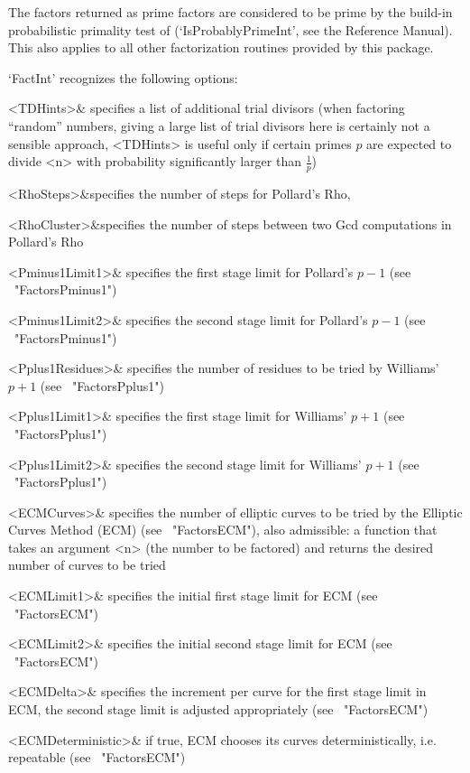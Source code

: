 The factors returned as prime factors are considered to be prime 
by the build-in probabilistic primality test of {\GAP} 
(`IsProbablyPrimeInt', see the Reference Manual).
This also applies to all other factorization routines 
provided by this package.

`FactInt' recognizes the following options:

\beginitems
   <TDHints>& specifies a list of additional trial divisors
   (when factoring ``random'' numbers, giving a large list
   of trial divisors here is certainly not a sensible approach,
   <TDHints> is useful only if certain primes $p$ are expected to
   divide <n> with probability significantly larger than 
   $\frac{1}{p}$)

   <RhoSteps>&specifies the number of steps for Pollard's Rho,

   <RhoCluster>&specifies the number of steps between two
   Gcd computations in Pollard's Rho

   <Pminus1Limit1>& specifies the first stage limit for Pollard's $p-1$
   (see ~"FactorsPminus1")

   <Pminus1Limit2>& specifies the second stage limit for Pollard's $p-1$
   (see ~"FactorsPminus1")

   <Pplus1Residues>& specifies the number of residues
   to be tried by Williams' $p+1$ (see ~"FactorsPplus1")

   <Pplus1Limit1>& specifies the first stage limit
   for Williams' $p+1$ (see ~"FactorsPplus1")

   <Pplus1Limit2>& specifies the second stage limit
   for Williams' $p+1$ (see ~"FactorsPplus1")

   <ECMCurves>& specifies the number of elliptic curves to be 
   tried by the Elliptic Curves Method (ECM) (see ~"FactorsECM"),
   also admissible: a function that takes an argument <n>
   (the number to be factored) and returns the desired number
   of curves to be tried 

   <ECMLimit1>& specifies the initial first stage limit
   for ECM (see ~"FactorsECM")

   <ECMLimit2>& specifies the initial second stage limit
   for ECM (see ~"FactorsECM")

   <ECMDelta>& specifies the increment per curve for the 
   first stage limit in ECM, the second stage limit is adjusted
   appropriately (see ~"FactorsECM")

   <ECMDeterministic>& if true, ECM chooses its curves 
   deterministically, i.e. repeatable (see ~"FactorsECM")

